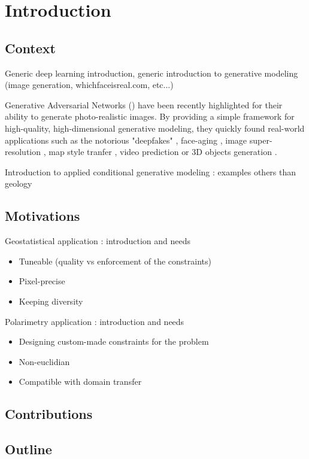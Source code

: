 \chapter*{Introduction}
\label{chap:intro}

\section*{Context}
Generic deep learning introduction, generic introduction to generative modeling (image generation, whichfaceisreal.com, etc...)

Generative Adversarial Networks (\GAN) \cite{Goodfellow2014} have been recently highlighted for their ability to generate photo-realistic images. By providing a simple framework for high-quality, high-dimensional generative modeling, they quickly found real-world applications such as the notorious "deepfakes" \citep{Vaccari2020}, face-aging \citep{Antipov2017}, image super-resolution \citep{Wang2020}, map style tranfer \citep{Kang2019}, video prediction \citep{Vondrick2016} or 3D objects generation \citep{Wu2017}.

Introduction to applied conditional generative modeling : examples others than geology

\section*{Motivations}
Geostatistical application :  introduction and needs \begin{itemize}
	\item Tuneable (quality vs enforcement of the constraints)
	\item Pixel-precise
	\item Keeping diversity
\end{itemize}

Polarimetry application : introduction and needs \begin{itemize}
	\item Designing custom-made constraints for the problem
	\item Non-euclidian
	\item Compatible with domain transfer
\end{itemize}

\section*{Contributions}

\section*{Outline}
